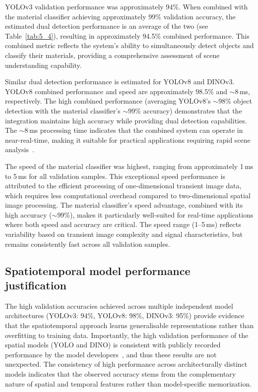 \documentclass[12pt,a4paper,oneside]{report}
\begin{document}
YOLOv3 validation performance was approximately 94\%. When combined with the material classifier achieving approximately 99\% validation accuracy, the estimated dual detection performance is an average of the two (see Table~\ref{tab:5_4}), resulting in approximately 94.5\% combined performance. This combined metric reflects the system's ability to simultaneously detect objects and classify their materials, providing a comprehensive assessment of scene understanding capability.

Similar dual detection performance is estimated for YOLOv8 and DINOv3. YOLOv8 combined performance and speed are approximately 98.5\% and $\sim$8\,ms, respectively. The high combined performance (averaging YOLOv8's $\sim$98\% object detection with the material classifier's $\sim$99\% accuracy) demonstrates that the integration maintains high accuracy while providing dual detection capabilities. The $\sim$8\,ms processing time indicates that the combined system can operate in near-real-time, making it suitable for practical applications requiring rapid scene analysis~\cite{gyongy2021}.

The speed of the material classifier was highest, ranging from approximately 1\,ms to 5\,ms for all validation samples. This exceptional speed performance is attributed to the efficient processing of one-dimensional transient image data, which requires less computational overhead compared to two-dimensional spatial image processing. The material classifier's speed advantage, combined with its high accuracy ($\sim$99\%), makes it particularly well-suited for real-time applications where both speed and accuracy are critical. The speed range (1--5\,ms) reflects variability based on transient image complexity and signal characteristics, but remains consistently fast across all validation samples.

\subsection{Spatiotemporal model performance justification}
\label{subsec:spatiotemporal_model_performance_justification}

The high validation accuracies achieved across multiple independent model architectures (YOLOv3: 94\%, YOLOv8: 98\%, DINOv3: 95\%) provide evidence that the spatiotemporal approach learns generalisable representations rather than overfitting to training data. Importantly, the high validation performance of the spatial models (YOLO and DINO) is consistent with publicly recorded performance by the model developers~\cite{redmon2018,simeoni2025}, and thus these results are not unexpected. The consistency of high performance across architecturally distinct models indicates that the observed accuracy stems from the complementary nature of spatial and temporal features rather than model-specific memorization.
\end{document}
